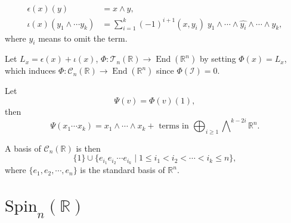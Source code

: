 \documentclass[11pt]{homework}
\begin{document}
\begin{remark}
    \begin{align*}
        \epsilon (x) (y) &= x \wedge y, \\
        \iota (x) (y_1 \wedge \cdots y_k) &= \sum_{i=1}^k (-1)^{i+1} (x, y_i) \; y_1 \wedge \cdots \wedge \hat{y_i} \wedge \cdots \wedge y_k,
    \end{align*}
    where $\hat{y_i}$ means to omit the term.

    Let $L_x = \epsilon (x) + \iota (x)$, $\Phi : \mathcal{T}_{n}(\mathbb{R}) \rightarrow \operatorname{End}(\mathbb{R}^n)$ by setting $\Phi(x) = L_x$, which induces $\Phi : \mathcal{C}_n (\mathbb{R}) \rightarrow \operatorname{End}(\mathbb{R}^n)$ since $\Phi(\mathcal{I}) = 0$.

    Let
    \begin{equation*}
        \Psi (v) = \Phi(v)(1),
    \end{equation*}
    then
    \begin{equation*}
        \Psi (x_1 \cdots x_k) = x_1 \wedge \cdots \wedge x_k + \text{ terms in } \bigoplus_{i\geq 1} \left .\bigwedge \right.^{k-2i} \mathbb{R}^n.
    \end{equation*}
\end{remark}

\begin{remark}
    A basis of $\mathcal{C}_n (\mathbb{R})$ is then 
    \begin{equation*}
        \{1\} \cup \{e_{i_1}e_{i_2} \cdots e_{i_k} \mid 1 \leq i_1 < i_2 < \cdots < i_k \leq n\},
    \end{equation*}
    where $\{e_1, e_2 , \cdots , e_n\}$ is the standard basis of $\mathbb{R}^n$.
\end{remark}

\section*{$\mathrm{Spin}_n(\mathbb{R})$}
\end{document}
